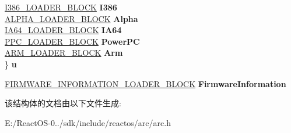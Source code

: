 \begin{DoxyCompactItemize}
\begin{tabbing}
\>\hyperlink{struct___i386___l_o_a_d_e_r___b_l_o_c_k}{I386\_LOADER\_BLOCK} {\bfseries I386}\\
\>\hyperlink{struct___a_l_p_h_a___l_o_a_d_e_r___b_l_o_c_k}{ALPHA\_LOADER\_BLOCK} {\bfseries Alpha}\\
\>\hyperlink{struct___i_a64___l_o_a_d_e_r___b_l_o_c_k}{IA64\_LOADER\_BLOCK} {\bfseries IA64}\\
\>\hyperlink{struct___p_p_c___l_o_a_d_e_r___b_l_o_c_k}{PPC\_LOADER\_BLOCK} {\bfseries PowerPC}\\
\>\hyperlink{struct___a_r_m___l_o_a_d_e_r___b_l_o_c_k}{ARM\_LOADER\_BLOCK} {\bfseries Arm}\\
\} {\bfseries u}\\

\end{tabbing}\item 
\mbox{\label{struct___l_o_a_d_e_r___p_a_r_a_m_e_t_e_r___b_l_o_c_k_a4c491debf79bea95355a8b21260cd0b1}} 
\hyperlink{struct___f_i_r_m_w_a_r_e___i_n_f_o_r_m_a_t_i_o_n___l_o_a_d_e_r___b_l_o_c_k}{F\+I\+R\+M\+W\+A\+R\+E\+\_\+\+I\+N\+F\+O\+R\+M\+A\+T\+I\+O\+N\+\_\+\+L\+O\+A\+D\+E\+R\+\_\+\+B\+L\+O\+CK} {\bfseries Firmware\+Information}
\end{DoxyCompactItemize}


该结构体的文档由以下文件生成\+:\begin{DoxyCompactItemize}
\item 
E\+:/\+React\+O\+S-\/0../sdk/include/reactos/arc/arc.\+h\end{DoxyCompactItemize}
